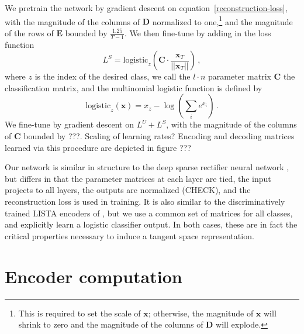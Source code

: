 \documentclass{article} %
\newcommand{\x}{\mathbf{x}}
\newcommand{\C}{\mathbf{C}}
\newcommand{\D}{\mathbf{D}}
\newcommand{\E}{\mathbf{E}}
\newcommand{\logistic}{\text{logistic}}
\begin{document}
We pretrain the network by gradient descent on equation~\ref{reconstruction-loss}, with the magnitude of the columns of $\D$ normalized to one,\footnote{This is required to set the scale of $\x$; otherwise, the magnitude of $\x$ will shrink to zero and the magnitude of the columns of $\D$ will explode.} and the magnitude of the rows of $\E$ bounded by $\frac{1.25}{T-1}$.  We then fine-tune by adding in the loss function
\begin{equation*} \label{discriminative-loss}
L^S = \logistic_z \left( \C \cdot \frac{\x_T}{\left|\left| \x_T \right|\right|} \right) \, ,
\end{equation*}
where $z$ is the index of the desired class, we call the $l \cdot n$ parameter matrix $\C$ the classification matrix, and the multinomial logistic function is defined by 
\begin{equation*}
  \logistic_z(\x) = x_z - \log\left( \sum_i e^{x_i} \right) \, .
\end{equation*}
We fine-tune by gradient descent on $L^U + L^S$, with the magnitude of the columns of $\C$ bounded by ???.  Scaling of learning rates?
Encoding and decoding matrices learned via this procedure are depicted in figure ???


Our network is similar in structure to the deep sparse rectifier neural network \cite{glorot2011}, but differs in that the parameter matrices at each layer are tied, the input projects to all layers, the outputs are normalized (CHECK), and the reconstruction loss is used in training.  %
It is also similar to the discriminatively trained LISTA encoders of \cite{sprechmann2012}, but we use a common set of matrices for all classes, and explicitly learn a logistic classifier output.  %
In both cases, these are in fact the critical properties necessary to induce a tangent space representation.



\section{Encoder computation}
\end{document}
